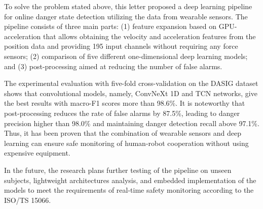 \documentclass[letterpaper,journal]{IEEEtran}
\begin{document}
To solve the problem stated above, this letter proposed a deep learning pipeline for online danger state detection utilizing the data from wearable sensors. The pipeline consists of three main parts: (1) feature expansion based on GPU-acceleration that allows obtaining the velocity and acceleration features from the position data and providing 195 input channels without requiring any force sensors; (2) comparison of five different one-dimensional deep learning models; and (3) post-processing aimed at reducing the number of false alarms.

The experimental evaluation with five-fold cross-validation on the DASIG dataset shows that convolutional models, namely, ConvNeXt 1D and TCN networks, give the best results with macro-F1 scores more than 98.6\%. It is noteworthy that post-processing reduces the rate of false alarms by 87.5\%, leading to danger precision higher than 98.0\% and maintaining danger detection recall above 97.1\%. Thus, it has been proven that the combination of wearable sensors and deep learning can ensure safe monitoring of human-robot cooperation without using expensive equipment.

In the future, the research plans further testing of the pipeline on unseen subjects, lightweight architectures analysis, and embedded implementation of the models to meet the requirements of real-time safety monitoring according to the ISO/TS 15066.




\end{document}
